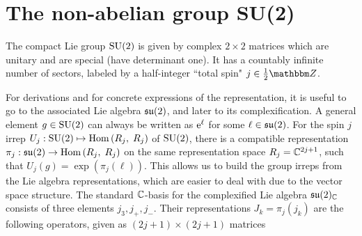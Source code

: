 \section{The non-abelian group SU(2)}
\label{sec:topo_data:SU2}

The compact Lie group $\mathrm{SU}(2)$ is given by complex $2 \times 2$ matrices which are unitary and are special (have determinant one).
%
It has a countably infinite number of sectors, labeled by a half-integer ``total spin" $j \in \tfrac{1}{2}\Zbb$.

For derivations and for concrete expressions of the representation, it is useful to go to the associated Lie algebra $\mathfrak{su}(2)$, and later to its complexification.
%
A general element $g \in\mathrm{SU}(2)$ can always be written as $\mathrm{e}^{\ell}$ for some $\ell\in\mathfrak{su}(2)$.
%
For the spin $j$ irrep $U_j: \mathrm{SU}(2) \mapsto \mathrm{Hom}\left(R_j,\; R_j\right)$ of $\mathrm{SU}(2)$, there is a compatible representation $\pi_j : \mathfrak{su}(2) \to \mathrm{Hom}\left(R_j,\; R_j\right)$ on the same representation space $R_j = \mathbb{C}^{2j + 1}$, such that $U_j(g) = \exp (\pi_j(\ell))$.
%
This allows us to build the group irreps from the Lie algebra representations, which are easier to deal with due to the vector space structure.
%
The standard $\mathbb{C}$-basis for the complexified Lie algebra $\mathfrak{su}(2)_{\mathbb{C}}$ consists of three elements $j_3, j_+, j_-$. Their representations $J_k = \pi_j(j_k)$ are the following operators, given as $(2j + 1) \times (2j + 1)$ matrices

